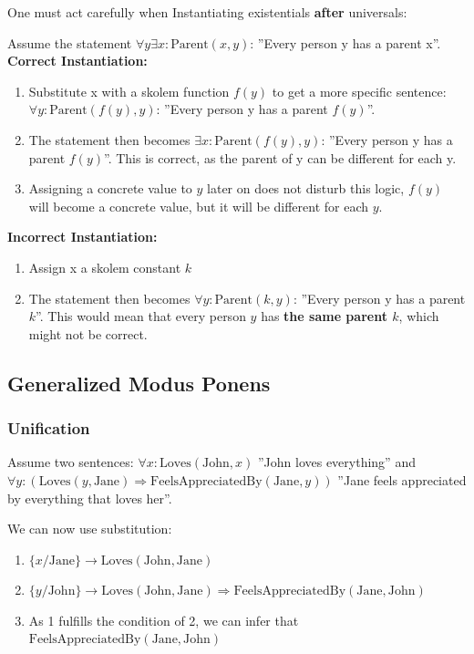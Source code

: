 \documentclass[
../EiKI_Summary.tex,
]
{subfiles}
\begin{document}
One must act carefully when Instantiating existentials \textbf{after} universals:

Assume the statement $\forall y \exists x: \text{Parent}(x, y)$: ''Every person y has a parent x''.\\

\textbf{Correct Instantiation:}
\begin{enumerate}
    \item Substitute x with a skolem function $f(y)$ to get a more specific sentence: $\forall y: \text{Parent}(f(y), y)$: ''Every person y has a parent $f(y)$''.
    \item The statement then becomes $\exists x: \text{Parent}(f(y), y)$: ''Every person y has a parent $f(y)$''. This is correct, as the parent of y can be different for each y.
    \item Assigning a concrete value to $y$ later on does not disturb this logic, $f(y)$ will become a concrete value, but it will be different for each $y$.
\end{enumerate}

\textbf{Incorrect Instantiation:}
\begin{enumerate}
    \item Assign x a skolem constant $k$
    \item The statement then becomes $\forall y: \text{Parent}(k, y)$: ''Every person y has a parent $k$''. This would mean that every person $y$ has \textbf{the same parent $k$}, which might not be correct. 
\end{enumerate}

\subsection{Generalized Modus Ponens}
\subsubsection{Unification}
Assume two sentences: $\forall x: \text{Loves}(\text{John}, x)$ ''John loves everything'' and $\forall y: (\text{Loves}(y,\text{Jane}) \Rightarrow \text{FeelsAppreciatedBy}(\text{Jane}, y))$ ''Jane feels appreciated by everything that loves her''.

We can now use substitution:
\begin{enumerate}
    \item $\{x / \text{Jane}\} \rightarrow \text{Loves}(\text{John}, \text{Jane})$
    \item $\{y / \text{John}\} \rightarrow \text{Loves}(\text{John}, \text{Jane}) \Rightarrow \text{FeelsAppreciatedBy}(\text{Jane}, \text{John})$
    \item As 1 fulfills the condition of 2, we can infer that $\text{FeelsAppreciatedBy}(\text{Jane}, \text{John})$
\end{enumerate}
\end{document}
